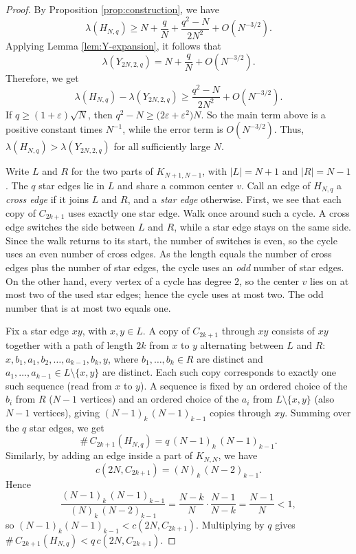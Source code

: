 \documentclass[11pt,a4paper]{article}
\theoremstyle{definition}
\theoremstyle{plain}
\newcommand{\eps}{\varepsilon}
\renewcommand{\ge}{\geqslant}
\begin{document}
\begin{proof}
By Proposition \ref{prop:construction}, we have 
\[
        \lambda(H_{N,q})
        \ge
        N+\frac qN+\frac{q^2-N}{2N^2}+O(N^{-3/2}).
\]
Applying Lemma \ref{lem:Y-expansion}, it follows that 
\[
        \lambda(Y_{2N,2,q})=N+\frac qN+O(N^{-3/2}).
\]
Therefore, we get 
\[
        \lambda(H_{N,q})-\lambda(Y_{2N,2,q})
        \ge
        \frac{q^2-N}{2N^2}+O(N^{-3/2}).
\]
If $q\ge(1+\eps)\sqrt N$, then
$q^2-N\ge \bigl( 2\varepsilon + \varepsilon^2 \bigr)N$. 
So the main term above is a positive constant times $N^{-1}$, while the error term is $O(N^{-3/2})$.  Thus, $ \lambda(H_{N,q})>\lambda(Y_{2N,2,q})$ for all sufficiently large $N$. 

Write $L$ and $R$ for the two parts of $K_{N+1,N-1}$, with $|L|=N+1$ and $|R|=N-1$. The $q$ star edges lie in $L$ and share a common center $v$. Call an edge of $H_{N,q}$ a \emph{cross edge} if it joins $L$ and $R$, and a \emph{star edge} otherwise.
First, we see that 
each copy of $C_{2k+1}$ uses exactly one star edge. 
Walk once around such a cycle. A cross edge switches the side between $L$ and $R$, 
while a star edge stays on the same side. Since the walk returns to its start, the number of switches is even, so the cycle uses an even number of cross edges. As the length equals the number of cross edges plus  the number of star edges, the cycle uses an \emph{odd} number of star edges. On the other hand, every vertex of a cycle has degree $2$, so the center $v$ lies on at most two of the used star edges; hence the cycle uses at most two. The odd number that is at most two equals one.

Fix a star edge $xy$, with $x,y\in L$. A copy of $C_{2k+1}$ through $xy$ consists of $xy$ together with a path of length $2k$ from $x$ to $y$ alternating between $L$ and $R$: $ x,b_1,a_1,b_2, \ldots,a_{k-1},b_k,y$, 
where $b_1,\ldots,b_k\in R$ are distinct and $a_1,\ldots,a_{k-1}\in L\setminus\{x,y\}$ are distinct. Each such copy corresponds to exactly one such sequence (read from $x$ to $y$). A sequence is fixed by an ordered choice of the $b_i$ from $R$ ($N-1$ vertices) and an ordered choice of the $a_i$ from $L\setminus\{x,y\}$ (also $N-1$ vertices), giving $(N-1)_k\,(N-1)_{k-1}$ copies through $xy$. Summing over the $q$ star edges, we get 
\[
    \texttt{\#}\, C_{2k+1}(H_{N,q})=q\,(N-1)_k\,(N-1)_{k-1}.
\]
Similarly, by adding an edge inside a part of $K_{N,N}$, we have 
$$c(2N,C_{2k+1})=(N)_k\,(N-2)_{k-1}. $$ 
Hence 
\[
    \frac{(N-1)_k\,(N-1)_{k-1}}{(N)_k\,(N-2)_{k-1}}
    =\frac{N-k}{N}\cdot\frac{N-1}{N-k}
    =\frac{N-1}{N}<1,
\]
so $(N-1)_k(N-1)_{k-1}<c(2N,C_{2k+1})$. Multiplying by $q$ gives $\texttt{\#}\,{C_{2k+1}}(H_{N,q})<q\,c(2N,C_{2k+1})$.
\end{proof}
\end{document}
